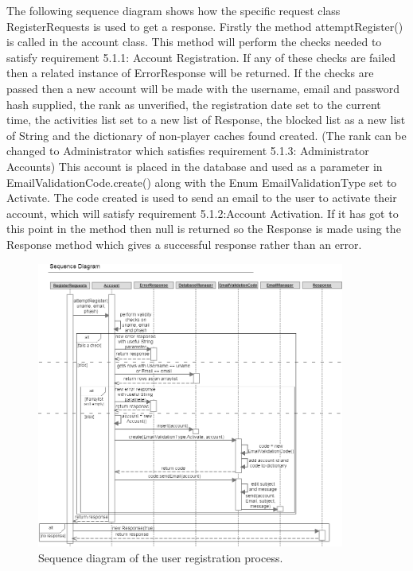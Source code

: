 The following sequence diagram shows how the specific request class RegisterRequests is used to get a response. Firstly the method attemptRegister() is called in the account class. This method will perform the checks needed to satisfy requirement 5.1.1: Account Registration. If any of these checks are failed then a related instance of ErrorResponse will be returned. If the checks are passed then a new account will be made with the username, email and password hash supplied, the rank as unverified, the registration date set to the current time, the activities list set to a new list of Response, the blocked list as a new list of String and the dictionary of non-player caches found created. (The rank can be changed to Administrator which satisfies requirement 5.1.3: Administrator Accounts) This account is placed in the database and used as a parameter in EmailValidationCode.create() along with the Enum EmailValidationType set to Activate. The code created is used to send an email to the user to activate their account, which will satisfy requirement 5.1.2:Account Activation. If it has got to this point in the method then null is returned so the Response is made using the Response method which gives a successful response rather than an error.

\begin{figure}
    \centering
    \includegraphics[width=0.9\textwidth]{images/sequence/registerUser}
    \caption{Sequence diagram of the user registration process.}
\end{figure}

